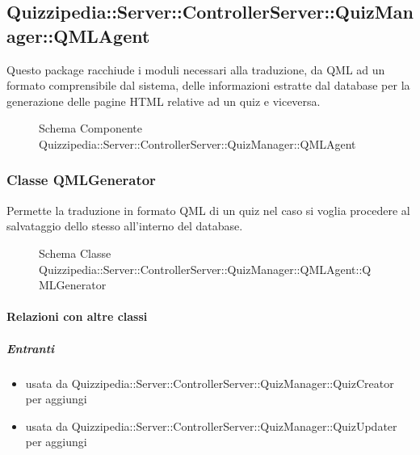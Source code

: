 \subsection{Quizzipedia::Server::ControllerServer::QuizManager::QMLAgent}
Questo package racchiude i moduli necessari alla traduzione, da QML ad un formato comprensibile dal sistema, delle informazioni estratte dal database per la generazione delle pagine HTML relative ad un quiz e viceversa.
\begin{figure}[H]
\centering
\noindent{}
\caption[Schema Componente Quizzipedia::Server::ControllerServer::QuizManager::QMLAgent]{Schema Componente Quizzipedia::Server::ControllerServer::QuizManager::QMLAgent}
\end{figure}
\subsubsection{Classe QMLGenerator}
Permette la traduzione in formato QML di un quiz nel caso si voglia procedere al salvataggio dello stesso all'interno del database.
\begin{figure}[H]
\centering
\noindent{}
\caption[Schema Classe QMLGenerator]{Schema Classe Quizzipedia::Server::ControllerServer::QuizManager::QMLAgent::QMLGenerator}
\end{figure}
\paragraph{Relazioni con altre classi}
\subparagraph{Entranti}
\begin{itemize}
\item usata da Quizzipedia::Server::ControllerServer::QuizManager::QuizCreator per aggiungi
\item usata da Quizzipedia::Server::ControllerServer::QuizManager::QuizUpdater per aggiungi
\end{itemize}
